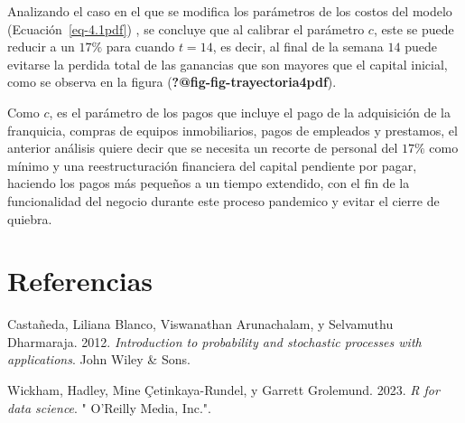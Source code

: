 \documentclass[
  us-letterpaper,
]{scrreprt}
\newlength{\cslhangindent}
\newenvironment{CSLReferences}[2] %
 {\begin{list}{}{%
  \setlength{\itemindent}{0pt}
  \setlength{\leftmargin}{0pt}
  \setlength{\parsep}{0pt}
  \ifodd #1
   \setlength{\leftmargin}{\cslhangindent}
   \setlength{\itemindent}{-1\cslhangindent}
  \fi
  \setlength{\itemsep}{#2\baselineskip}}}
 {\end{list}}
\theoremstyle{definition}
\theoremstyle{plain}
\theoremstyle{plain}
\theoremstyle{remark}
\begin{document}
Analizando el caso en el que se modifica los parámetros de los costos
del modelo (Ecuación~\ref{eq-4.1pdf}) , se concluye que al calibrar el
parámetro \(c\), este se puede reducir a un \(17 \%\) para cuando
\(t=14\), es decir, al final de la semana \(14\) puede evitarse la
perdida total de las ganancias que son mayores que el capital inicial,
como se observa en la figura (\textbf{?@fig-fig-trayectoria4pdf}).

Como \(c\), es el parámetro de los pagos que incluye el pago de la
adquisición de la franquicia, compras de equipos inmobiliarios, pagos de
empleados y prestamos, el anterior análisis quiere decir que se necesita
un recorte de personal del \(17 \%\) como mínimo y una reestructuración
financiera del capital pendiente por pagar, haciendo los pagos más
pequeños a un tiempo extendido, con el fin de la funcionalidad del
negocio durante este proceso pandemico y evitar el cierre de quiebra.


\chapter*{Referencias}\label{referencias}


\label{refs}
\begin{CSLReferences}{1}{0}
Castañeda, Liliana Blanco, Viswanathan Arunachalam, y Selvamuthu
Dharmaraja. 2012. \emph{Introduction to probability and stochastic
processes with applications}. John Wiley \& Sons.

Wickham, Hadley, Mine Çetinkaya-Rundel, y Garrett Grolemund. 2023.
\emph{R for data science}. " O'Reilly Media, Inc.".

\end{CSLReferences}
\end{document}

